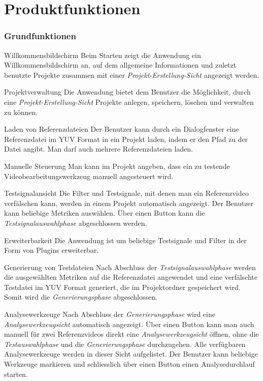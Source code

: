 \chapter {Produktfunktionen}

\subsection{Grundfunktionen}

\newItemPF Willkommensbildschirm
\newline
Beim Starten zeigt die Anwendung ein Willkommensbildschirm an, auf dem allgemeine Informationen und zuletzt benutzte Projekte zusammen mit einer \emph{Projekt-Erstellung-Sicht} angezeigt werden.

\newItemPF Projektverwaltung
\newline
Die Anwendung bietet dem Benutzer die Möglichkeit, durch eine \emph{Projekt-Erstellung-Sicht} Projekte anlegen, speichern, löschen und verwalten zu können.

\newItemPF Laden von Referenzdateien
\newline
Der Benutzer kann durch ein Dialogfenster eine Referenzdatei im YUV Format in ein Projekt laden, indem er den Pfad zu der Datei angibt. Man darf auch mehrere Referenzdateien laden.

\newItemPF Manuelle Steuerung
\newline
Man kann im Projekt angeben, dass ein zu testende Videobearbeitungswerkzeug manuell angesteuert wird.

\newItemPF Testsignalansicht
\newline
Die Filter und Testsignale, mit denen man ein Referenzvideo verfälschen kann, werden in einem Projekt automatisch angezeigt. Der Benutzer kann beliebige Metriken auswählen. Über einen Button kann die \emph{Testsignalauswahlphase} abgeschlossen werden.

\newItemPF Erweiterbarkeit
\newline
Die Anwendung ist um beliebige Testsignale und Filter in der Form von Plugins erweiterbar.

\newItemPF Generierung von Testdateien
\newline
Nach Abschluss der \emph{Testsignalauswahlphase} werden die ausgewählten Metriken auf die Referenzdatei angewendet und eine verfälschte Testdatei im YUV Format generiert, die im Projektordner gespeichert wird. Somit wird die \emph{Generierungsphase} abgeschlossen.

\newItemPF Analysewerkzeuge
\newline
Nach Abschluss der \emph{Generierungsphase} wird eine \emph{Analysewerkzeugsicht} automatisch angezeigt. Über einen Button kann man auch manuell für zwei Referenzvideos direkt eine \emph{Analysewerkzeugsicht} öffnen, ohne die \emph{Testauswahlphase} und die \emph{Generierungsphase} durchzugehen. Alle verfügbaren Analysewerkzeuge werden in dieser Sicht aufgelistet. Der Benutzer kann beliebige Werkzeuge markieren und schliesslich über einen Button einen Analysedurchlauf starten.

